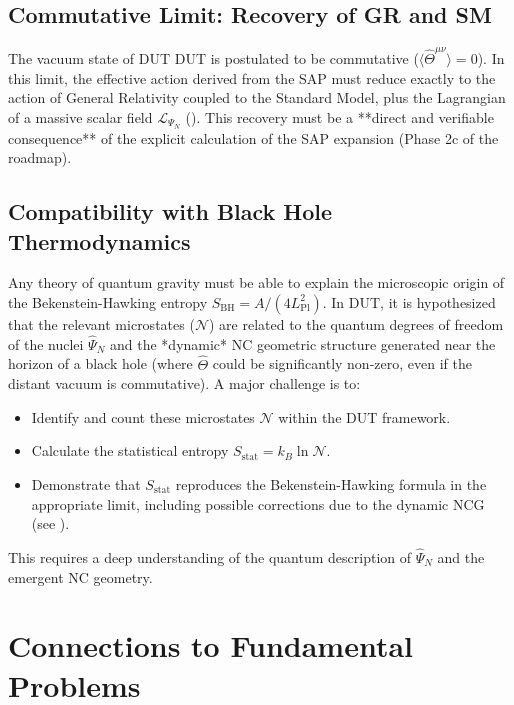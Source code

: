 \documentclass[11pt, a4paper]{article}
\theoremstyle{remark}
\newcommand{\Op}[1]{\hat{#1}}
\begin{document}
\subsection{Commutative Limit: Recovery of GR and SM}
\label{subsec:commutative_limit_final}
The vacuum state of DUT DUT is postulated to be commutative (\( \langle \Op{\Theta}^{\mu\nu} \rangle = 0 \)). In this limit, the effective action derived from the SAP must reduce exactly to the action of General Relativity coupled to the Standard Model, plus the Lagrangian of a massive scalar field \( \mathcal{L}_{\Psi_N} \) (). This recovery must be a **direct and verifiable consequence** of the explicit calculation of the SAP expansion (Phase 2c of the roadmap).

\subsection{Compatibility with Black Hole Thermodynamics}
\label{subsec:black_hole_thermo_final}
Any theory of quantum gravity must be able to explain the microscopic origin of the Bekenstein-Hawking entropy \( S_{\text{BH}} = A / (4 L_{\text{Pl}}^2) \). In DUT, it is hypothesized that the relevant microstates (\( \mathcal{N} \)) are related to the quantum degrees of freedom of the nuclei \( \Op{\Psi}_N \) and the *dynamic* NC geometric structure generated near the horizon of a black hole (where \( \Op{\Theta} \) could be significantly non-zero, even if the distant vacuum is commutative). A major challenge is to:
\begin{itemize}
    \item Identify and count these microstates \( \mathcal{N} \) within the DUT framework.
    \item Calculate the statistical entropy \( S_{\text{stat}} = k_B \ln \mathcal{N} \).
    \item Demonstrate that \( S_{\text{stat}} \) reproduces the Bekenstein-Hawking formula in the appropriate limit, including possible corrections due to the dynamic NCG (see ).
\end{itemize}
This requires a deep understanding of the quantum description of \( \Op{\Psi}_N \) and the emergent NC geometry.

\section{Connections to Fundamental Problems}
\label{sec:fundamental_problems_final}
\end{document}
